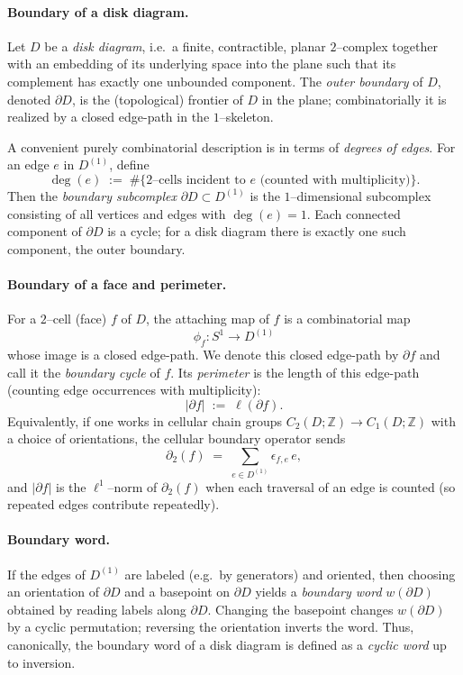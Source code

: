 \documentclass[11pt]{article}
\theoremstyle{definition}
\theoremstyle{plain}
\theoremstyle{remark}
\begin{document}
\paragraph{Boundary of a disk diagram.}
Let $D$ be a \emph{disk diagram}, i.e.\ a finite, contractible, planar $2$--complex together with an embedding of its underlying space into the plane such that its complement has exactly one unbounded component. The \emph{outer boundary} of $D$, denoted $\partial D$, is the (topological) frontier of $D$ in the plane; combinatorially it is realized by a closed edge-path in the $1$--skeleton.

A convenient purely combinatorial description is in terms of \emph{degrees of edges}. For an edge $e$ in $D^{(1)}$, define
\[
\deg(e) \;:=\; \#\{\text{$2$--cells incident to $e$ (counted with multiplicity)}\}.
\]
Then the \emph{boundary subcomplex} $\partial D \subset D^{(1)}$ is the $1$--dimensional subcomplex consisting of all vertices and edges with $\deg(e)=1$. Each connected component of $\partial D$ is a cycle; for a disk diagram there is exactly one such component, the outer boundary.

\paragraph{Boundary of a face and perimeter.}
For a $2$--cell (face) $f$ of $D$, the attaching map of $f$ is a combinatorial map
\[
\phi_f : S^1 \longrightarrow D^{(1)}
\]
whose image is a closed edge-path. We denote this closed edge-path by $\partial f$ and call it the \emph{boundary cycle} of $f$.
Its \emph{perimeter} is the length of this edge-path (counting edge occurrences with multiplicity):
\[
|\partial f| \;:=\; \ell(\partial f).
\]
Equivalently, if one works in cellular chain groups $C_2(D;\mathbb Z)\to C_1(D;\mathbb Z)$ with a choice of orientations, the cellular boundary operator sends
\[
\partial_2(f) \;=\; \sum_{e \in D^{(1)}} \epsilon_{f,e}\, e,
\]
and $|\partial f|$ is the $\ell^1$--norm of $\partial_2(f)$ when each traversal of an edge is counted (so repeated edges contribute repeatedly).

\paragraph{Boundary word.}
If the edges of $D^{(1)}$ are labeled (e.g.\ by generators) and oriented, then choosing an orientation of $\partial D$ and a basepoint on $\partial D$ yields a \emph{boundary word} $w(\partial D)$ obtained by reading labels along $\partial D$.
Changing the basepoint changes $w(\partial D)$ by a cyclic permutation; reversing the orientation inverts the word. Thus, canonically, the boundary word of a disk diagram is defined as a \emph{cyclic word} up to inversion.
\end{document}
